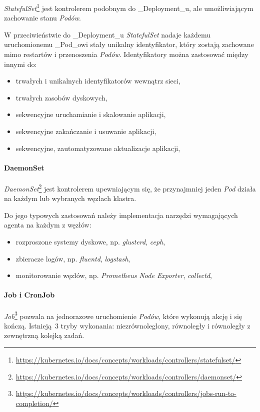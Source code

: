 \documentclass[a4paper,12pt,twoside,openany]{report}
\providecommand{\tightlist}{%
  \setlength{\itemsep}{0pt}\setlength{\parskip}{0pt}}
\DeclareRobustCommand{\href}[2]{#2\footnote{\url{#1}}}
\begin{document}
\href{https://kubernetes.io/docs/concepts/workloads/controllers/statefulset/}{\emph{StatefulSet}}
jest kontrolerem podobnym do \_Deployment\_u, ale umożliwiającym
zachowanie stanu \emph{Podów}.

W przeciwieństwie do \_Deployment\_u \emph{StatefulSet} nadaje każdemu
uruchomionemu \_Pod\_owi stały unikalny identyfikator, który zostają
zachowane mimo restartów i przenoszenia \emph{Podów}. Identyfikatory
można zastosować między innymi do:

\begin{itemize}
\tightlist
\item
  trwałych i unikalnych identyfikatorów wewnątrz sieci,
\item
  trwałych zasobów dyskowych,
\item
  sekwencyjne uruchamianie i skalowanie aplikacji,
\item
  sekwencyjne zakańczanie i usuwanie aplikacji,
\item
  sekwencyjne, zautomatyzowane aktualizacje aplikacji,
\end{itemize}

\hypertarget{daemonset}{%
\paragraph{DaemonSet}\label{daemonset}}

\href{https://kubernetes.io/docs/concepts/workloads/controllers/daemonset/}{\emph{DaemonSet}}
jest kontrolerem upewniającym się, że przynajmniej jeden \emph{Pod}
działa na każdym lub wybranych węzłach klastra.

Do jego typowych zastosowań należy implementacja narzędzi wymagających
agenta na każdym z węzłów:

\begin{itemize}
\tightlist
\item
  rozproszone systemy dyskowe, np. \emph{glusterd}, \emph{ceph},
\item
  zbieracze logów, np. \emph{fluentd}, \emph{logstash},
\item
  monitorowanie węzłów, np. \emph{Prometheus Node Exporter},
  \emph{collectd},
\end{itemize}

\hypertarget{job-i-cronjob}{%
\paragraph{Job i CronJob}\label{job-i-cronjob}}

\href{https://kubernetes.io/docs/concepts/workloads/controllers/jobs-run-to-completion/}{\emph{Job}}
pozwala na jednorazowe uruchomienie \emph{Podów}, które wykonują akcję i
się kończą. Istnieją~3 tryby wykonania: niezrównoleglony, równoległy i
równoległy z zewnętrzną kolejką zadań.
\end{document}
